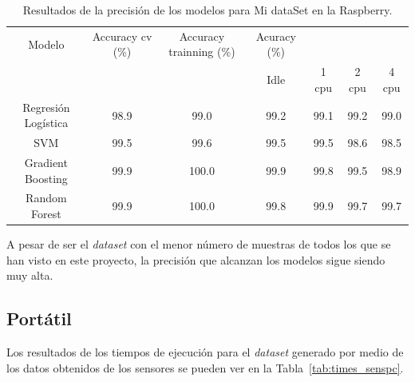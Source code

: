 \documentclass[a4paper, 12pt]{book}
\begin{document}
\begin{table}[]
\begin{adjustbox}{width=\textwidth}
\centering
    \begin{tabular}{c  c  c  c  c  c  c}
    \hline
    Modelo & Accuracy cv (\%) & Accuracy trainning (\%) & Acuracy (\%) & & & \\
    \cline{4-7}
     &  &   &  Idle & 1 cpu & 2 cpu & 4 cpu \\
     \hline
     Regresión Logística & 98.9 & 99.0 & 99.2 & 99.1 & 99.2 & 99.0\\
     SVM & 99.5 & 99.6 & 99.5 & 99.5 & 98.6 & 98.5\\
     Gradient Boosting & 99.9 & 100.0 & 99.9 & 99.8 & 99.5 & 98.9\\
     Random Forest & 99.9 & 100.0 & 99.8 & 99.9 & 99.7 & 99.7\\
    \hline
    \end{tabular}
\end{adjustbox}
\caption{Resultados de la precisión de los modelos para Mi dataSet en la Raspberry.}
\label{tab:acc_sensrasp}
\end{table}

A pesar de ser el \textit{dataset} con el menor número de muestras de todos los que se han visto en este proyecto, la precisión que alcanzan los modelos sigue siendo muy alta.

\subsection{Portátil}
\label{subsec:pc_sensados}

Los resultados de los tiempos de ejecución para el \textit{dataset} generado por medio de los datos obtenidos de los sensores se pueden ver en la Tabla~\ref{tab:times_senspc}.
\end{document}
